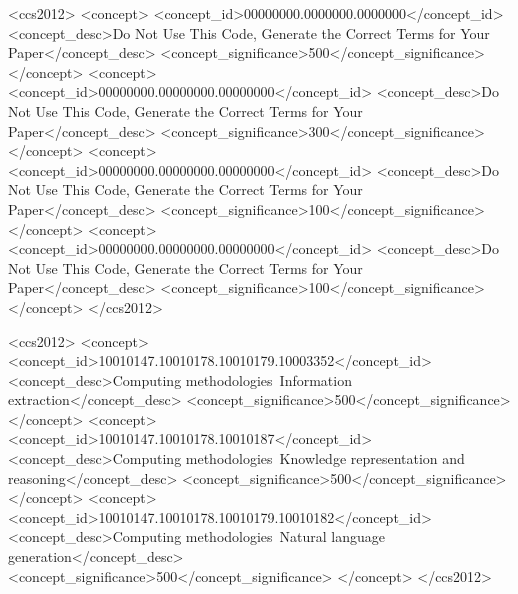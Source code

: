 \documentclass[sigconf, nonacm]{acmart} %
\begin{document}
\begin{abstract}
  Experimental results validate that the proposed framework achieves superior predictive performance over existing memory architectures and exhibits stronger explainability. It can clearly trace the information chain affecting stock prices and analyze the underlying mechanisms of information transmission, endowing the model with professional reasoning capabilities comparable to those of human analysts. This substantially enhances the transparency and trustworthiness of the decision-making process, showing broad application potential in complex financial semantic reasoning tasks.
\end{abstract}

\begin{CCSXML}
<ccs2012>
 <concept>
 <concept_id>00000000.0000000.0000000</concept_id>
  <concept_desc>Do Not Use This Code, Generate the Correct Terms for Your Paper</concept_desc>
  <concept_significance>500</concept_significance>
 </concept>
 <concept>
 <concept_id>00000000.00000000.00000000</concept_id>
 <concept_desc>Do Not Use This Code, Generate the Correct Terms for Your Paper</concept_desc>
  <concept_significance>300</concept_significance>
 </concept>
 <concept>
  <concept_id>00000000.00000000.00000000</concept_id>
  <concept_desc>Do Not Use This Code, Generate the Correct Terms for Your Paper</concept_desc>
  <concept_significance>100</concept_significance>
 </concept>
 <concept>
  <concept_id>00000000.00000000.00000000</concept_id>
  <concept_desc>Do Not Use This Code, Generate the Correct Terms for Your Paper</concept_desc>
  <concept_significance>100</concept_significance>
 </concept>
</ccs2012>
\end{CCSXML}


\begin{CCSXML}
<ccs2012>
<concept>
<concept_id>10010147.10010178.10010179.10003352</concept_id>
<concept_desc>Computing methodologies~Information extraction</concept_desc>
<concept_significance>500</concept_significance>
</concept>
<concept>
<concept_id>10010147.10010178.10010187</concept_id>
<concept_desc>Computing methodologies~Knowledge representation and reasoning</concept_desc>
<concept_significance>500</concept_significance>
</concept>
<concept>
<concept_id>10010147.10010178.10010179.10010182</concept_id>
<concept_desc>Computing methodologies~Natural language generation</concept_desc>
<concept_significance>500</concept_significance>
</concept>
</ccs2012>
\end{CCSXML}
\end{document}
